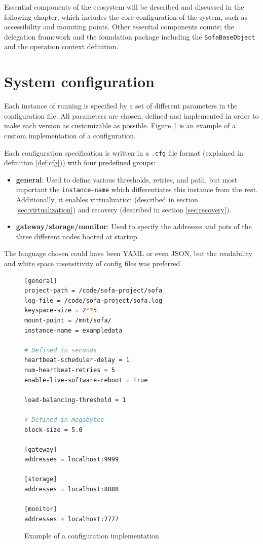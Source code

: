 Essential components of the \CodeName ecosystem will be described and discussed in the following chapter, which includes the core configuration of the system, such as accessibility and mounting points. Other essential components counts; the delegation framework and the foundation package including the \texttt{SofaBaseObject} and the operation context definition.

\section{System configuration} \label{sec:configuration}
Each instance of \CodeName running is specified by a set of different parameters in the configuration file. All parameters are chosen, defined and implemented in order to make each version as customizable as possible. Figure \ref{fig:cfg_example} is an example of a custom implementation of a \CodeName configuration.
\newline

Each configuration specification is written in a \texttt{.cfg} file format (explained in definition \ref{def:cfg})) with four predefined groups:
\begin{itemize}
	\item \textbf{general}: Used to define various thresholds, retries, and path, but most important the \texttt{instance-name} which differentiates this instance from the rest. Additionally, it enables virtualization (described in section \ref{sec:virtualization}) and recovery (described in section \ref{sec:recovery}).
	\item \textbf{gateway/storage/monitor}: Used to specify the addresses and pots of the three different nodes booted at startup.
\end{itemize}

The language chosen could have been YAML \cite{PageYaml} or even JSON, but the readability and white space insensitivity of config files was preferred.

\begin{figure}
\vspace*{4mm}
\begin{lstlisting}[language=bash, frame=single, basicstyle=\ttfamily\tiny, otherkeywords={[,],=}, numbers=none, deletekeywords=enable]
[general]
project-path = /code/sofa-project/sofa
log-file = /code/sofa-project/sofa.log
keyspace-size = 2**5
mount-point = /mnt/sofa/
instance-name = exampledata

# Defined in seconds
heartbeat-scheduler-delay = 1
num-heartbeat-retries = 5
enable-live-software-reboot = True

load-balancing-threshold = 1

# Defined in megabytes
block-size = 5.0

[gateway]
addresses = localhost:9999

[storage]
addresses = localhost:8888

[monitor]
addresses = localhost:7777
\end{lstlisting}

\caption{Example of a \CodeName configuration implementation \label{fig:cfg_example}}
\end{figure}


